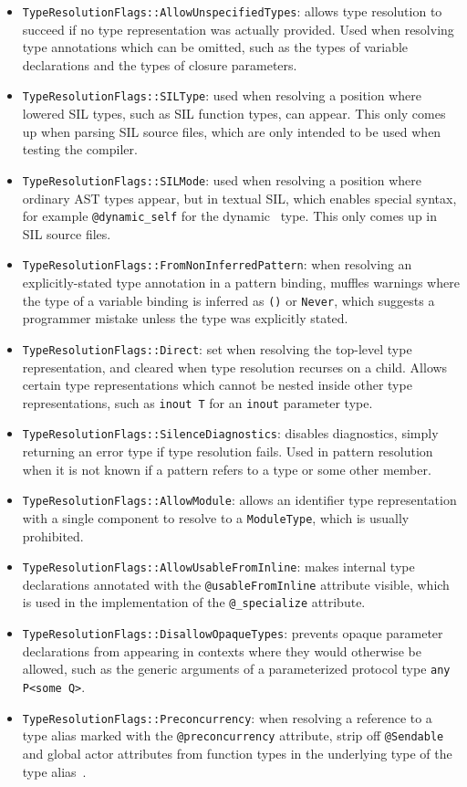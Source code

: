 \documentclass[../generics]{subfiles}
\begin{document}
\begin{itemize}
\item \texttt{TypeResolutionFlags::AllowUnspecifiedTypes}: allows type resolution to succeed if no type representation was actually provided. Used when resolving type annotations which can be omitted, such as the types of variable declarations and the types of closure parameters.
\item \texttt{TypeResolutionFlags::SILType}: used when resolving a position where lowered SIL types, such as SIL function types, can appear. This only comes up when parsing SIL source files, which are only intended to be used when testing the compiler.
\item \texttt{TypeResolutionFlags::SILMode}: used when resolving a position where ordinary AST types appear, but in textual SIL, which enables special syntax, for example \verb|@dynamic_self| for the dynamic \tSelf\ type. This only comes up in SIL source files.
\item \texttt{TypeResolutionFlags::FromNonInferredPattern}: when resolving an explicitly-stated type annotation in a pattern binding, muffles warnings where the type of a variable binding is inferred as \texttt{()} or \texttt{Never}, which suggests a programmer mistake unless the type was explicitly stated.
\item \texttt{TypeResolutionFlags::Direct}: set when resolving the top-level type representation, and cleared when type resolution recurses on a child. Allows certain type representations which cannot be nested inside other type representations, such as \texttt{inout T} for an \texttt{inout} parameter type.
\item \texttt{TypeResolutionFlags::SilenceDiagnostics}: disables diagnostics, simply returning an error type if type resolution fails. Used in pattern resolution when it is not known if a pattern refers to a type or some other member.
\item \texttt{TypeResolutionFlags::AllowModule}: allows an identifier type representation with a single component to resolve to a \texttt{ModuleType}, which is usually prohibited.
\item \texttt{TypeResolutionFlags::AllowUsableFromInline}: makes internal type declarations annotated with the \texttt{@usableFromInline} attribute visible, which is used in the implementation of the \verb|@_specialize| attribute.
\item \texttt{TypeResolutionFlags::DisallowOpaqueTypes}: prevents opaque parameter declarations from appearing in contexts where they would otherwise be allowed, such as the generic arguments of a parameterized protocol type \verb|any P<some Q>|.
\item \texttt{TypeResolutionFlags::Preconcurrency}: when resolving a reference to a type alias marked with the \texttt{@preconcurrency} attribute, strip off \texttt{@Sendable} and global actor attributes from function types in the underlying type of the type alias~\cite{se0337}.
\end{itemize}
\end{document}
